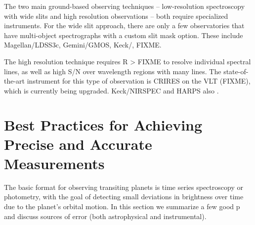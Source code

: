 \documentclass[graybox,natbib,nosecnum]{svmult}
\begin{document}
The two main ground-based observing techniques -- low-resolution spectroscopy with wide slits and high resolution observations -- both require specialized instruments. For the wide slit approach, there are only a few observatories that have multi-object spectrographs with a custom slit mask option. These include Magellan/LDSS3c, Gemini/GMOS, Keck/, FIXME.  

The high resolution technique requires R > FIXME to resolve individual spectral lines, as well as high S/N over wavelength regions with many lines. The state-of-the-art instrument for this type of observation is CRIRES on the VLT (FIXME), which is currently being upgraded.  Keck/NIRSPEC and HARPS also \citep{lockwood14, martins15}.

\section{Best Practices for Achieving Precise and Accurate Measurements}
The basic format for observing transiting planets is time series spectroscopy or photometry, with the goal of detecting small deviations in brightness over time due to the planet's orbital motion.  In this section we summarize a few good p and discuss sources of error (both astrophysical and instrumental).


\end{document}
